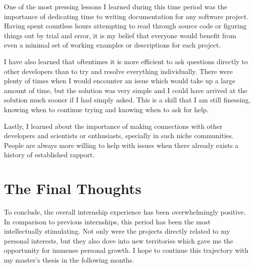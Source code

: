         One of the most pressing lessons I learned during this time period was the importance of dedicating time to writing documentation for any software project. Having spent countless hours attempting to read through source code or figuring things out by trial and error, it is my belief that everyone would benefit from even a minimal set of working examples or descriptions for each project.

        I have also learned that oftentimes it is more efficient to ask questions directly to other developers than to try and resolve everything individually. There were plenty of times when I would encounter an issue which would take up a large amount of time, but the solution was very simple and I could have arrived at the solution much sooner if I had simply asked. This is a skill that I am still finessing, knowing when to continue trying and knowing when to ask for help.

        Lastly, I learned about the importance of making connections with other developers and scientists or enthusiasts, specially in such niche communities. People are always more willing to help with issues when there already exists a history of established rapport.


    \pagebreak

    \section*{The Final Thoughts}

        To conclude, the overall internship experience has been overwhelmingly positive. In comparison to previous internships, this period has been the most intellectually stimulating. Not only were the projects directly related to my personal interests, but they also dove into new territories which gave me the opportunity for immense personal growth. I hope to continue this trajectory with my master's thesis in the following months.
